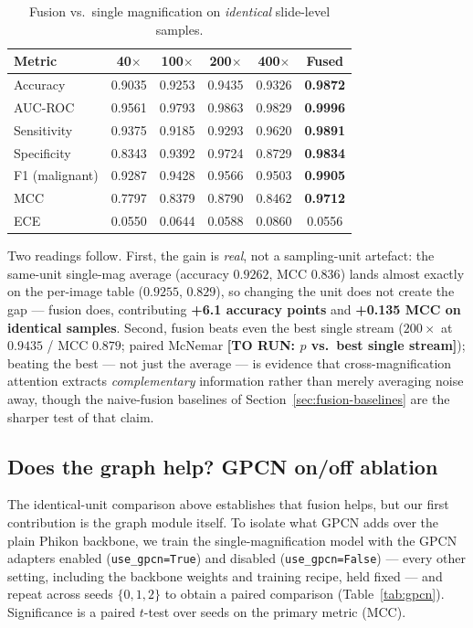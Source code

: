 \documentclass[11pt]{article}
\newcommand{\todo}[1]{{\color{red}\textbf{[TO RUN: #1]}}}
\begin{document}
\begin{table}[t]
\centering
\caption{Fusion vs.\ single magnification on \emph{identical} slide-level samples.}
\label{tab:ablation}
\small
\begin{tabular}{@{}lccccc@{}}
\toprule
Metric & 40$\times$ & 100$\times$ & 200$\times$ & 400$\times$ & \textbf{Fused} \\
\midrule
Accuracy      & 0.9035 & 0.9253 & 0.9435 & 0.9326 & \textbf{0.9872} \\
AUC-ROC       & 0.9561 & 0.9793 & 0.9863 & 0.9829 & \textbf{0.9996} \\
Sensitivity   & 0.9375 & 0.9185 & 0.9293 & 0.9620 & \textbf{0.9891} \\
Specificity   & 0.8343 & 0.9392 & 0.9724 & 0.8729 & \textbf{0.9834} \\
F1 (malignant)& 0.9287 & 0.9428 & 0.9566 & 0.9503 & \textbf{0.9905} \\
MCC           & 0.7797 & 0.8379 & 0.8790 & 0.8462 & \textbf{0.9712} \\
ECE           & 0.0550 & 0.0644 & 0.0588 & 0.0860 & 0.0556 \\
\bottomrule
\end{tabular}
\end{table}

Two readings follow. First, the gain is \emph{real}, not a sampling-unit artefact:
the same-unit single-mag average (accuracy $0.9262$, MCC $0.836$) lands almost
exactly on the per-image table ($0.9255$, $0.829$), so changing the unit does not
create the gap — fusion does, contributing \textbf{+6.1 accuracy points} and
\textbf{+0.135 MCC on identical samples}. Second, fusion beats even the best single
stream ($200\times$ at $0.9435$ / MCC $0.879$; paired McNemar
\todo{$p$ vs.\ best single stream}); beating the best — not just the
average — is evidence that cross-magnification attention extracts \emph{complementary}
information rather than merely averaging noise away, though the naive-fusion
baselines of Section~\ref{sec:fusion-baselines} are the sharper test of that claim.

\subsection{Does the graph help? GPCN on/off ablation}
\label{sec:gpcn-ablation}
The identical-unit comparison above establishes that fusion helps, but our first
contribution is the graph module itself. To isolate what GPCN adds over the plain
Phikon backbone, we train the single-magnification model with the GPCN adapters
enabled (\texttt{use\_gpcn=True}) and disabled (\texttt{use\_gpcn=False}) — every
other setting, including the backbone weights and training recipe, held fixed —
and repeat across seeds $\{0,1,2\}$ to obtain a paired comparison
(Table~\ref{tab:gpcn}). Significance is a paired $t$-test over seeds on the primary
metric (MCC).
\end{document}
